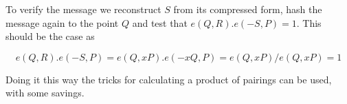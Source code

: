 \documentclass{llncs}
\begin{document}
To verify the message we reconstruct $S$ from its compressed form, hash the message again to the point $Q$
and test that $e(Q,R).e(-S,P) = 1$. This should be the case as 

$$ e(Q,R).e(-S,P) = e(Q,xP).e(-xQ,P) = e(Q,xP)/e(Q,xP) = 1 $$

Doing it this way the tricks for calculating a product of pairings \cite{scott} can be used, with 
some savings.




\end{document}
